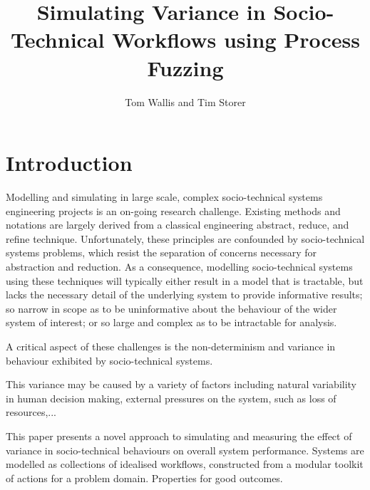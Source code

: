 \documentclass[11pt, twocolumn]{article}
\title{Simulating Variance in Socio-Technical Workflows using Process Fuzzing}
\author{Tom Wallis and Tim Storer}
\begin{document}

\maketitle


\begin{abstract}
\end{abstract}


\section{Introduction}


Modelling and simulating in large scale, complex socio-technical systems
engineering projects is an on-going research challenge.  Existing methods and
notations are largely derived from a classical engineering abstract, reduce, and
refine technique.  Unfortunately, these principles are confounded by
socio-technical systems problems, which resist the separation of concerns
necessary for abstraction and reduction.  As a consequence, modelling
socio-technical systems using these techniques will typically either result in a
model that is tractable, but lacks the necessary detail of the underlying system
to provide informative results; so narrow in scope as to be uninformative about
the behaviour of the wider system of interest; or so large and complex as to be
intractable for analysis.

A critical aspect of these challenges is the non-determinism and variance in
behaviour exhibited by socio-technical systems.

This variance may be caused by a variety of factors including natural
variability in human decision making, external pressures on the system, such as
loss of resources,...

This paper presents a novel approach to simulating and measuring the effect of
variance in socio-technical behaviours on overall system performance.  Systems
are modelled as collections of idealised workflows, constructed from a modular
toolkit of actions for a problem domain.  Properties for good outcomes.
\end{document}
